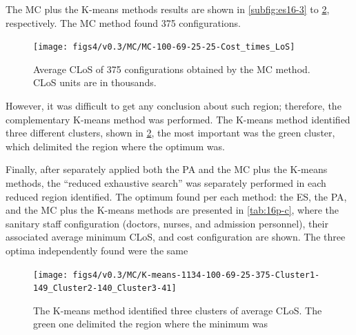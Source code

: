 The MC plus the K-means methods results are shown in \ref{subfig:es16-3}
to \ref{subfig:km16-3}, respectively. The MC method found 375 configurations.
\begin{figure}[H]
\centering{}\texttt{[image: figs4/v0.3/MC/MC-100-69-25-25-Cost\_times\_LoS]}\caption{Average CLoS of 375 configurations obtained by the MC method. CLoS
units are in thousands.\label{subfig:mc16-3}}
\end{figure}
 However, it was difficult to get any conclusion about such region;
therefore, the complementary K-means method was performed. The K-means
method identified three different clusters, shown in \ref{subfig:km16-3},
the most important was the green cluster, which delimited the region
where the optimum was.

Finally, after separately applied both the PA and the MC plus the
K-means methods, the \textquotedblleft{}reduced exhaustive search\textquotedblright{}
was separately performed in each reduced region identified. The optimum
found per each method: the ES, the PA, and the MC plus the K-means
methods are presented in \ref{tab:16p-c}, where the sanitary staff
configuration (doctors, nurses, and admission personnel), their associated
average minimum CLoS, and cost configuration are shown. The three
optima independently found were the same
\begin{figure}[H]
\begin{centering}
\texttt{[image: figs4/v0.3/MC/K-means-1134-100-69-25-375-Cluster1-149\_Cluster2-140\_Cluster3-41]}
\par\end{centering}

\caption{The K-means method identified three clusters of average CLoS. The
green one delimited the region where the minimum was \label{subfig:km16-3}}
\end{figure}


